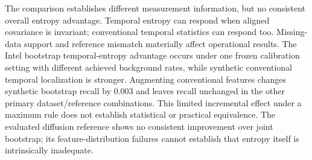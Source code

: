 The comparison establishes different measurement information, but no consistent
overall entropy advantage. Temporal entropy can respond when aligned covariance
is invariant; conventional temporal statistics can respond too. Missing-data
support and reference mismatch materially affect operational results. The
Intel bootstrap temporal-entropy advantage occurs under one frozen calibration
setting with different achieved background rates, while synthetic conventional
temporal localization is stronger. Augmenting conventional features changes
synthetic bootstrap recall by 0.003 and leaves recall unchanged in the
other primary dataset/reference combinations. This limited incremental effect
under a maximum rule does not establish statistical or practical equivalence.
The evaluated diffusion reference shows no consistent improvement over joint
bootstrap; its feature-distribution failures cannot establish that entropy
itself is intrinsically inadequate.
